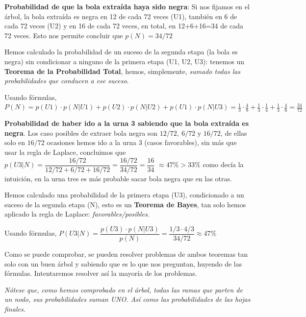 \begin{example}
\vspace{2mm} \textbf{Probabilidad de que la bola extraída haya sido negra}: Si nos fijamos en el árbol, la bola extraída es negra en 12 de cada 72 veces (U1), también en 6 de cada 72 veces (U2) y en 16 de cada 72 veces, en total, en 12+6+16=34 de cada 72 veces. Esto nos permite concluir que $p(N)=34/72$

\vspace{2mm} Hemos calculado la probabilidad de un suceso de la segunda etapa (la bola es negra) sin condicionar a ninguno de la primera etapa (U1, U2, U3): tenemos un \textbf{Teorema de la Probabilidad Total}, hemos, simplemente, \emph{sumado todas las probabilidades que conducen a ese suceso}.

\vspace{2mm} \textcolor{gris}{Usando fórmulas, $P(N)=p(U1)\cdot p(N|U1)+p(U2)\cdot p(N|U2)+p(U1)\cdot p(N|U3)=\frac 1 3 \cdot \frac 4 8 + \frac 1 3 \cdot \frac 1 4 + \frac 1 3 \cdot \frac 4 6 = \frac{34}{72}$}

\vspace{2mm} \textbf{Probabilidad de haber ido a la urna 3 sabiendo que la bola extraída es negra}. Los caso posibles de extraer bola negra son $12/72,\ 6/72 \text{ y } 16/72$, de ellas solo en $16/72$ ocasiones hemos ido a la urna 3 (casos favorables), sin más que usar la regla de Laplace, concluimos que $p(U3|N)=\dfrac{16/72}{12/72 + 6/72 + 16/72}=\dfrac{16/72}{34/72}=\dfrac {16}{34} $ \textcolor{gris}{$\approx 47\%>33\%$} \textcolor{gris}{como decía la intuición, en la urna tres es más probable sacar bola negra que en las otras.}

\vspace{2mm} Hemos calculado una probabilidad de la primera etapa (U3), condicionado a un suceso de la segunda etapa (N), esto es un \textbf{Teorema de Bayes}, tan solo hemos aplicado la regla de Laplace: \emph{favorables/posibles}. 

\vspace{2mm} \textcolor{gris}{Usando fórmulas, $P(U3|N)=\dfrac{p(U3)\cdot p(N|U3)}{p(N)}=\dfrac {1/3 \cdot 4/3}{34/72}\approx 47\%$}

\vspace{4mm}\textsf{Como se puede comprobar, se pueden resolver problemas de ambos teoremas tan solo con un buen árbol y sabiendo que es lo que nos preguntan, huyendo de las fórmulas. Intentaremos resolver así la mayoría de los problemas.}

\vspace{2mm} \textsl{Nótese que, como hemos comprobado en el árbol, todas las ramas que parten de un nodo, sus probabilidades suman UNO. Así como las probabilidades de las hojas finales.}
\end{example}


